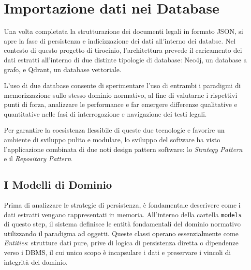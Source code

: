 \section{Importazione dati nei Database}
\label{sec:database_ingestion}

Una volta completata la strutturazione dei documenti legali in formato JSON, si apre la fase di persistenza e indicizzazione dei dati all'interno dei databse. Nel contesto di questo progetto di tirocinio, l'architettura prevede il caricamento dei dati estratti all'interno di due distinte tipologie di database: Neo4j, un database a grafo, e Qdrant, un database vettoriale.

L'uso di due database consente di sperimentare l'uso di entrambi i paradigmi di memorizzazione sullo stesso dominio normativo, al fine di valutarne i rispettivi punti di forza, analizzare le performance e far emergere differenze qualitative e quantitative nelle fasi di interrogazione e navigazione dei testi legali.

Per garantire la coesistenza flessibile di queste due tecnologie e favorire un ambiente di sviluppo pulito e modulare, lo sviluppo del software ha visto l'applicazione combinata di due noti design pattern software: lo \textit{Strategy Pattern} e il \textit{Repository Pattern}.

\subsection{I Modelli di Dominio}
Prima di analizzare le strategie di persistenza, è fondamentale descrivere come i dati estratti vengano rappresentati in memoria. All'interno della cartella \texttt{models} di questo step, il sistema definisce le entità fondamentali del dominio normativo utilizzando il paradigma ad oggetti. Queste classi operano essenzialmente come \textit{Entities}: strutture dati pure, prive di logica di persistenza diretta o dipendenze verso i DBMS, il cui unico scopo è incapsulare i dati e preservare i vincoli di integrità del dominio.

